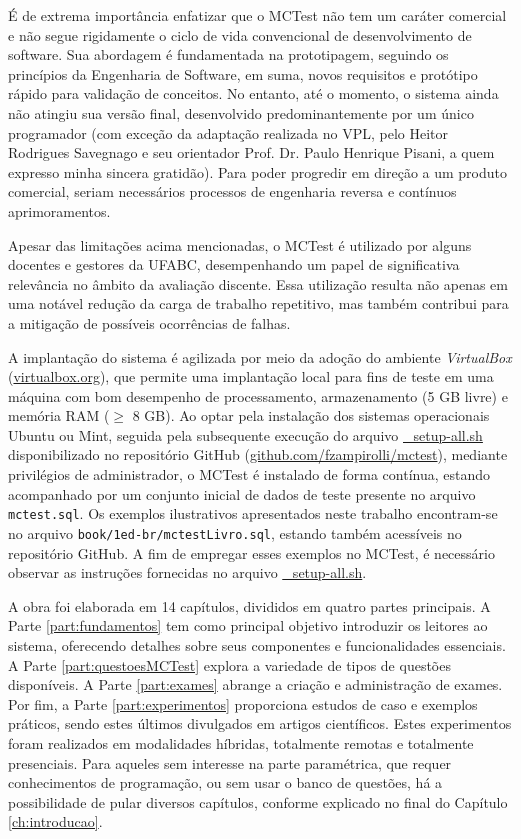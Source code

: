 É de extrema importância enfatizar que o MCTest não tem um caráter comercial e não segue rigidamente o ciclo de vida convencional de desenvolvimento de software. Sua abordagem é fundamentada na prototipagem, seguindo os princípios da Engenharia de Software, em suma, novos requisitos e protótipo rápido para validação de conceitos. No entanto, até o momento, o sistema ainda não atingiu sua versão final, desenvolvido predominantemente por um único programador (com exceção da adaptação realizada no VPL, pelo Heitor Rodrigues Savegnago e seu orientador Prof. Dr. Paulo Henrique Pisani, a quem expresso minha sincera gratidão). Para poder progredir em direção a um produto comercial, seriam necessários processos de engenharia reversa e contínuos aprimoramentos. 

Apesar das limitações acima mencionadas, o MCTest é utilizado por alguns docentes e gestores da UFABC, desempenhando um papel de significativa relevância no âmbito da avaliação discente. Essa utilização resulta não apenas em uma notável redução da carga de trabalho repetitivo, mas também contribui para a mitigação de possíveis ocorrências de falhas. 

A implantação do sistema é agilizada por meio da adoção do ambiente \textit{VirtualBox} (\href{https://www.virtualbox.org}{virtualbox.org}), que permite uma implantação local para fins de teste em uma máquina com bom desempenho de processamento, armazenamento (5 GB livre) e memória RAM ($\geq$ 8 GB). Ao optar pela instalação dos sistemas operacionais Ubuntu ou Mint, seguida pela subsequente execução do arquivo \href{https://github.com/fzampirolli/mctest/blob/master/_setup-all.sh}{\_setup-all.sh} disponibilizado no repositório GitHub (\href{https://github.com/fzampirolli/mctest}{github.com/fzampirolli/mctest}), mediante privilégios de administrador, o MCTest é instalado de forma contínua, estando acompanhado por um conjunto inicial de dados de teste presente no arquivo \verb|mctest.sql|. Os exemplos ilustrativos apresentados neste trabalho encontram-se no arquivo \verb|book/1ed-br/mctestLivro.sql|, estando também acessíveis no repositório GitHub. A fim de empregar esses exemplos no MCTest, é necessário observar as instruções fornecidas no arquivo \href{https://github.com/fzampirolli/mctest/blob/master/_setup-all.sh}{\_setup-all.sh}.

A obra foi elaborada em 14 capítulos, divididos em quatro partes principais. A Parte \ref{part:fundamentos} tem como principal objetivo introduzir os leitores ao sistema, oferecendo detalhes sobre seus componentes e funcionalidades essenciais. A Parte \ref{part:questoesMCTest} explora a variedade de tipos de questões disponíveis. A Parte \ref{part:exames} abrange a criação e administração de exames. Por fim, a Parte \ref{part:experimentos} proporciona estudos de caso e exemplos práticos, sendo estes últimos divulgados em artigos científicos. Estes experimentos foram realizados em modalidades híbridas, totalmente remotas e totalmente presenciais. 
%
Para aqueles sem interesse na parte paramétrica, que requer conhecimentos de programação, ou sem usar o banco de questões, há a possibilidade de pular diversos capítulos, conforme explicado no final do Capítulo \ref{ch:introducao}.

